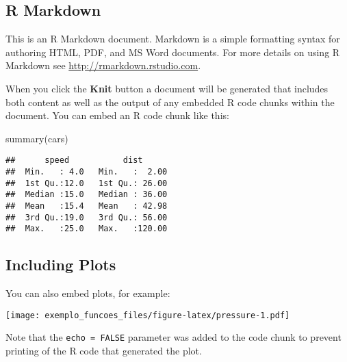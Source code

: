 \documentclass[
]{article}
\newenvironment{Shaded}{\begin{snugshade}}{\end{snugshade}}
\newcommand{\FunctionTok}[1]{\textcolor[rgb]{0.00,0.00,0.00}{#1}}
\newcommand{\NormalTok}[1]{#1}
\begin{document}
\hypertarget{r-markdown}{%
\subsection{R Markdown}\label{r-markdown}}

This is an R Markdown document. Markdown is a simple formatting syntax
for authoring HTML, PDF, and MS Word documents. For more details on
using R Markdown see \url{http://rmarkdown.rstudio.com}.

When you click the \textbf{Knit} button a document will be generated
that includes both content as well as the output of any embedded R code
chunks within the document. You can embed an R code chunk like this:

\begin{Shaded}
\begin{Highlighting}[]
\FunctionTok{summary}\NormalTok{(cars)}
\end{Highlighting}
\end{Shaded}

\begin{verbatim}
##      speed           dist       
##  Min.   : 4.0   Min.   :  2.00  
##  1st Qu.:12.0   1st Qu.: 26.00  
##  Median :15.0   Median : 36.00  
##  Mean   :15.4   Mean   : 42.98  
##  3rd Qu.:19.0   3rd Qu.: 56.00  
##  Max.   :25.0   Max.   :120.00
\end{verbatim}

\hypertarget{including-plots}{%
\subsection{Including Plots}\label{including-plots}}

You can also embed plots, for example:

\texttt{[image: exemplo\_funcoes\_files/figure-latex/pressure-1.pdf]}

Note that the \texttt{echo\ =\ FALSE} parameter was added to the code
chunk to prevent printing of the R code that generated the plot.
\end{document}

